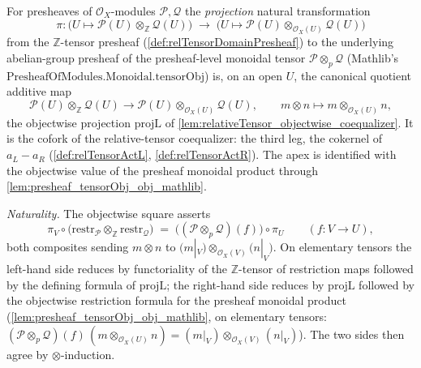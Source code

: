 \begin{definition}

  \label{def:relTensorProj}
  For presheaves of \(\mathcal{O}_X\)-modules \(\mathcal{P}, \mathcal{Q}\) the
  \emph{projection} natural transformation
  \[
    \pi : \bigl(U \mapsto \mathcal{P}(U) \otimes_{\mathbb{Z}} \mathcal{Q}(U)\bigr)
      \;\longrightarrow\;
      \bigl(U \mapsto \mathcal{P}(U) \otimes_{\mathcal{O}_X(U)} \mathcal{Q}(U)\bigr)
  \]
  from the \(\mathbb{Z}\)-tensor presheaf (\cref{def:relTensorDomainPresheaf}) to
  the underlying abelian-group presheaf of the presheaf-level monoidal tensor
  \(\mathcal{P} \otimes_p \mathcal{Q}\) (Mathlib's
  \(\mathrm{PresheafOfModules.Monoidal.tensorObj}\)) is, on an open \(U\), the
  canonical quotient additive map
  \[
    \mathcal{P}(U) \otimes_{\mathbb{Z}} \mathcal{Q}(U)
    \longrightarrow
    \mathcal{P}(U) \otimes_{\mathcal{O}_X(U)} \mathcal{Q}(U),
    \qquad
    m \otimes n \longmapsto m \otimes_{\mathcal{O}_X(U)} n,
  \]
  the objectwise projection \(\mathrm{projL}\) of
  \cref{lem:relativeTensor_objectwise_coequalizer}. It is the cofork of the
  relative-tensor coequalizer: the third leg, the cokernel of \(a_L - a_R\)
  (\cref{def:relTensorActL}, \cref{def:relTensorActR}). The apex is identified
  with the objectwise value of the presheaf monoidal product through
  \cref{lem:presheaf_tensorObj_obj_mathlib}.

  \emph{Naturality.} The objectwise square asserts
  \[
    \pi_V \circ
      \bigl(\mathrm{restr}_{\mathcal{P}} \otimes_{\mathbb{Z}}
        \mathrm{restr}_{\mathcal{Q}}\bigr)
    \;=\;
    \bigl((\mathcal{P} \otimes_p \mathcal{Q})(f)\bigr) \circ \pi_U
    \qquad (f : V \to U),
  \]
  both composites sending \(m \otimes n\) to
  \(\bigl(m|_V\bigr) \otimes_{\mathcal{O}_X(V)} \bigl(n|_V\bigr)\). On elementary
  tensors the left-hand side reduces by functoriality of the
  \(\mathbb{Z}\)-tensor of restriction maps followed by the defining formula of
  \(\mathrm{projL}\); the right-hand side reduces by \(\mathrm{projL}\) followed
  by the objectwise restriction formula for the presheaf monoidal product
  (\cref{lem:presheaf_tensorObj_obj_mathlib}, on elementary tensors:
  \((\mathcal{P} \otimes_p \mathcal{Q})(f)\,(m \otimes_{\mathcal{O}_X(U)} n) =
  (m|_V) \otimes_{\mathcal{O}_X(V)} (n|_V)\)). The two sides then agree by
  \(\otimes\)-induction.

\end{definition}

